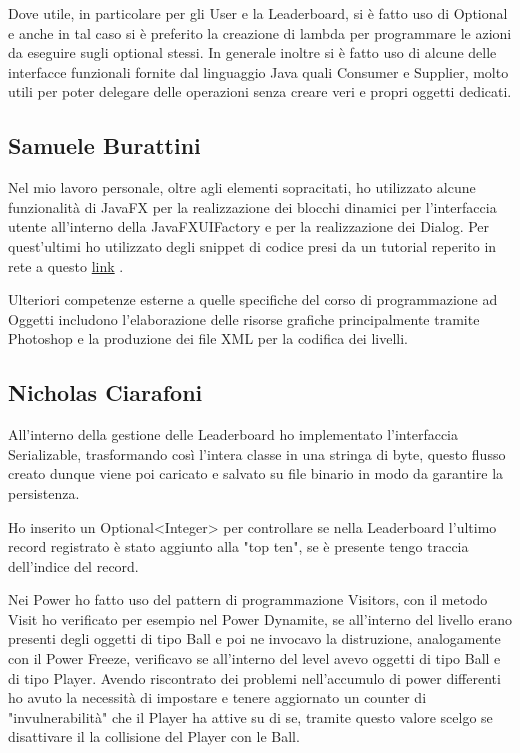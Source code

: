 \documentclass[a4paper,12pt]{report}
\begin{document}
Dove utile, in particolare per gli User e la Leaderboard, si è fatto uso di Optional e anche in tal caso si è preferito la creazione di lambda per programmare le azioni da eseguire sugli optional stessi.
In generale inoltre si è fatto uso di alcune delle interfacce funzionali fornite dal linguaggio Java quali Consumer e Supplier, molto utili per poter delegare delle operazioni senza creare veri e propri oggetti dedicati.

\subsection*{Samuele Burattini}
Nel mio lavoro personale, oltre agli elementi sopracitati, ho utilizzato alcune funzionalità di JavaFX per la realizzazione dei blocchi dinamici per l'interfaccia utente all'interno della JavaFXUIFactory e per la realizzazione dei Dialog. Per quest'ultimi ho utilizzato degli snippet di codice presi da un tutorial reperito in rete a questo \href{http://code.makery.ch/blog/javafx-dialogs-official/} {link} .

Ulteriori competenze esterne a quelle specifiche del corso di programmazione ad Oggetti includono l'elaborazione delle risorse grafiche principalmente tramite Photoshop e la produzione dei file XML per la codifica dei livelli.

\subsection*{Nicholas Ciarafoni}
All'interno della gestione delle Leaderboard ho implementato l'interfaccia Serializable, trasformando così l'intera classe in una stringa di byte, questo flusso creato dunque viene poi caricato e salvato su file binario in modo da garantire la persistenza.

Ho inserito un Optional<Integer> per controllare se nella Leaderboard l'ultimo record registrato è stato aggiunto alla "top ten", se è presente tengo traccia dell'indice del record.

Nei Power ho fatto uso del pattern di programmazione Visitors, con il metodo Visit ho verificato per esempio nel Power Dynamite, se all'interno del livello erano presenti degli oggetti di tipo Ball e poi ne invocavo la distruzione, analogamente con il Power Freeze, verificavo se all'interno del level avevo oggetti di tipo Ball e di tipo Player.
Avendo riscontrato dei problemi nell'accumulo di power differenti ho avuto la necessità di impostare e tenere aggiornato un counter di "invulnerabilità" che il Player ha attive su di se, tramite questo valore scelgo se disattivare il la collisione del Player con le Ball.
\end{document}
